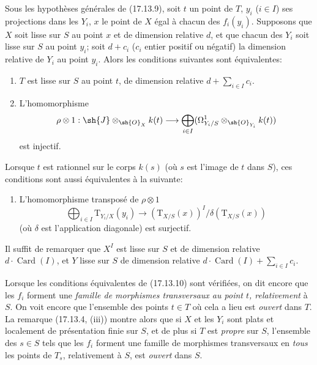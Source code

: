 \begin{corollary}[17.13.10]
\label{IV.17.13.10}
Sous les hypothèses générales de (17.13.9), soit $t$ un point de $T$, $y_i$ ($i\in I$) ses projections dans les $Y_i$, $x$ le point de $X$ égal à chacun des $f_i(y_i)$. Supposons que $X$ soit lisse sur $S$ au point $x$ et de dimension relative $d$, et que chacun des $Y_i$ soit lisse sur $S$ au point $y_i$; soit $d+c_i$ ($c_i$ entier positif ou négatif) la dimension relative de $Y_i$ au point $y_i$. Alors les conditions suivantes sont équivalentes:


\begin{enumerate}
  \item[a)] $T$ est lisse sur $S$ au point $t$, de dimension relative $d+\sum_{i\in I}c_i$.
  \item[b)] L'homomorphisme
  \[
  \rho\otimes1:\sh{J}\otimes_{\sh{O}_X}k(t)\to\bigoplus_{i\in I}(\Omega^1_{Y_i/S}\otimes_{\sh{O}_{Y_i}}k(t))
  \]
  est injectif.
\end{enumerate}
Lorsque $t$ est rationnel sur le corps $k(s)$ (où $s$ est l'image de $t$ dans $S$), ces conditions sont aussi équivalentes à la suivante:
\begin{enumerate}
  \item[b')] L'homomorphisme transposé de $\rho\otimes1$
  \[
  \bigoplus_{i\in I}\mathrm{T}_{Y_i/X}(y_i)\to(\mathrm{T}_{X/S}(x))^I/\delta(\mathrm{T}_{X/S}(x))
  \]
  (où $\delta$ est l'application diagonale) est surjectif.
\end{enumerate}
Il suffit de remarquer que $X^I$ est lisse sur $S$ et de dimension relative $d\cdot\operatorname{Card}(I)$, et $Y$ lisse sur $S$ de dimension relative $d\cdot\operatorname{Card}(I)+\sum_{i\in I}c_i$.

Lorsque les conditions équivalentes de (17.13.10) sont vérifiées, on dit encore que les $f_i$ forment une \emph{famille de morphismes transversaux au point $t$, relativement} à $S$. On voit encore que l'ensemble des points $t\in T$ où cela a lieu est \emph{ouvert} dans $T$. La remarque (17.13.4, (iii)) montre alors que si $X$ et les $Y_i$ sont plats et localement de présentation finie sur $S$, et de plus si $T$ est \emph{propre} sur $S$, l'ensemble des $s\in S$ tels que les $f_i$ forment une famille de morphismes transversaux en \emph{tous} les points de $T_s$, relativement à $S$, est \emph{ouvert} dans $S$.
\end{corollary}

